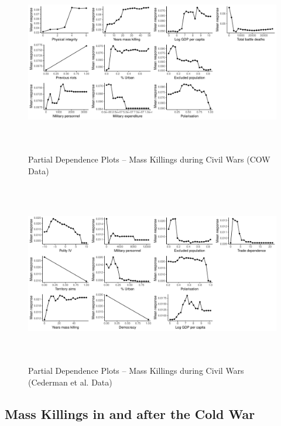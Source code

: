 \documentclass[a4paper,12pt]{article}
\begin{document}
\begin{figure}[H]
    \begin{center}
    \includegraphics[width=\textwidth, height=8cm]{images/rf-cow-pd.pdf}
    \caption{Partial Dependence Plots -- Mass Killings during Civil Wars (COW Data)}
    \label{fig:drfdpp3}
    \end{center}
\end{figure}	
	
\begin{figure}[H]
    \begin{center}
    \includegraphics[width=\textwidth, height=8cm]{images/rf-eth-pd.pdf}
    \caption{Partial Dependence Plots -- Mass Killings during Civil Wars (Cederman et al. Data)}
    \label{fig:drfdpp4}
    \end{center}
\end{figure}

\subsection{Mass Killings in and after the Cold War}%
\label{sub:mass_killings_in_and_after_the_cold_war}
\end{document}
